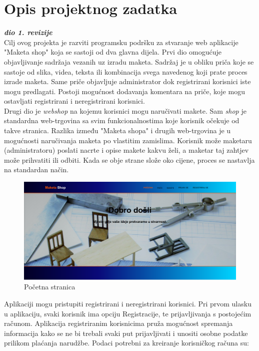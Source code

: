 \chapter{Opis projektnog zadatka}
		
		\textbf{\textit{dio 1. revizije}}\\
		
		\indent Cilj ovog projekta je razviti programsku podršku za stvaranje web aplikacije "Maketa shop" koja se sastoji od dva glavna dijela. 
		\indent Prvi dio omogućuje objavljivanje sadržaja vezanih uz izradu maketa. Sadržaj je u obliku priča koje se sastoje od slika, videa, teksta ili kombinacija svega navedenog koji prate proces izrade maketa. Same priče objavljuje administrator dok registrirani korisnici iste mogu predlagati. Postoji mogućnost dodavanja komentara na priče, koje mogu ostavljati registrirani i neregistrirani korisnici. \\
		\indent Drugi dio je \textit{webshop} na kojemu korisnici mogu naručivati makete. Sam \textit{shop} je standardna web-trgovina sa svim funkcionalnostima koje korisnik očekuje od takve stranica. Razlika između "Maketa shopa" i drugih web-trgovina je u mogućnosti naručivanja maketa po vlastitim zamislima. Korisnik može maketaru (administratoru) poslati nacrte i opise makete kakvu želi, a maketar taj zahtjev može prihvatiti ili odbiti. Kada se obje strane slože oko cijene, proces se nastavlja na standardan način.
		
		\begin{figure}[H]
			\includegraphics[width=.9\linewidth]{slike/20201112_182209.png}
			\centering
			\caption{Početna stranica}
			\label{fig:opis1}
		\end{figure}
	
		Aplikaciji mogu pristupiti registrirani i neregistrirani korisnici. Pri prvom ulasku u aplikaciju, svaki korisnik ima opciju Registracije, te prijavljivanja s postojećim računom. Aplikacija registriranim korisnicima pruža mogućnost spremanja informacija kako se ne bi trebali svaki put prijavljivati i unositi osobne podatke prilikom plaćanja narudžbe. Podaci potrebni za kreiranje korisničkog računa su:
		
